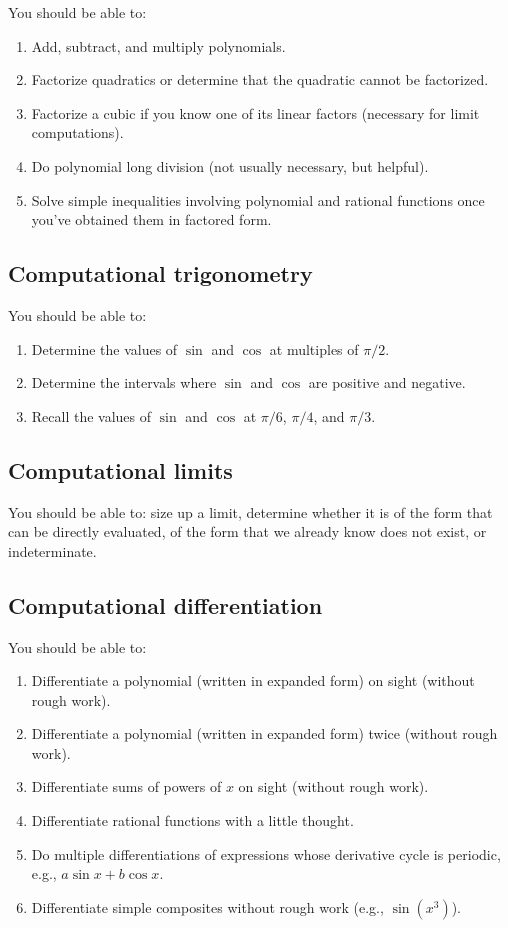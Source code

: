 \documentclass[10pt]{amsart}
\begin{document}
You should be able to:

\begin{enumerate}
\item Add, subtract, and multiply polynomials.
\item Factorize quadratics or determine that the quadratic cannot be
  factorized.
\item Factorize a cubic if you know one of its linear factors
  (necessary for limit computations).
\item Do polynomial long division (not usually necessary, but helpful).
\item Solve simple inequalities involving polynomial and rational
  functions once you've obtained them in factored form.
\end{enumerate}

\subsection{Computational trigonometry}

You should be able to:

\begin{enumerate}
\item Determine the values of $\sin$ and $\cos$ at multiples of
  $\pi/2$.
\item Determine the intervals where $\sin$ and $\cos$ are positive and
  negative.
\item Recall the values of $\sin$ and $\cos$ at $\pi/6$, $\pi/4$, and
  $\pi/3$.
\end{enumerate}

\subsection{Computational limits}

You should be able to: size up a limit, determine whether it is of the
form that can be directly evaluated, of the form that we already know
does not exist, or indeterminate.

\subsection{Computational differentiation}

You should be able to:

\begin{enumerate}
\item Differentiate a polynomial (written in expanded form) on sight
  (without rough work).
\item Differentiate a polynomial (written in expanded form) twice
  (without rough work).
\item Differentiate sums of powers of $x$ on sight (without rough
  work).
\item Differentiate rational functions with a little thought.
\item Do multiple differentiations of expressions whose derivative
  cycle is periodic, e.g., $a \sin x + b \cos x$.
\item Differentiate simple composites without rough work (e.g.,
  $\sin(x^3)$).
\end{enumerate}
\end{document}
